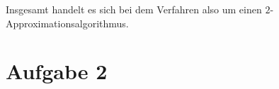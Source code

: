 \documentclass[12pt,a4paper]{article}
\begin{document}
\begin{enumerate}[a)]
 	Insgesamt handelt es sich bei dem Verfahren also um einen \(2\)-Appro\-xi\-ma\-tions\-algorithmus.
 	
 	
\end{enumerate}

\section*{Aufgabe 2}
\end{document}

